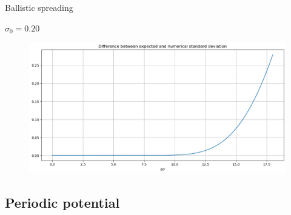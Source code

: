 \begin{frame}{Ballistic spreading}
{\begin{minipage}{0.31\textwidth}
\begin{figure}
        \end{figure}
    \end{minipage}
    \hfill
    \begin{minipage}{0.31\textwidth}
        \begin{center}
            $\sigma_0=0.20$
        \end{center}
        \vspace{-0.25cm}
        \begin{figure}
            \centering
            \includegraphics[width=\textwidth]{Immagini/plot-sigma-diff-2.png}
        \end{figure}
    \end{minipage}

    \vspace{-0.15cm}

    \begin{figure}[H]
        \centering
    \end{figure}}
\end{frame}

\subsection{Periodic potential}

